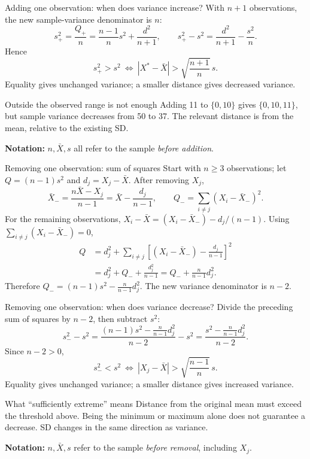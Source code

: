 \documentclass[aspectratio=169,11pt]{beamer}
\begin{document}
\begin{frame}{Adding one observation: when does variance increase?}
  \small
  With \(n+1\) observations, the new sample-variance denominator is \(n\):
  \[
    s_+^2=\frac{Q_+}{n}=\frac{n-1}{n}s^2+\frac{d^2}{n+1},
    \qquad
    s_+^2-s^2=\frac{d^2}{n+1}-\frac{s^2}{n}.
  \]
  Hence
  \[
    {s_+^2>s^2\ \Longleftrightarrow\
    |X^*-\bar X|>\sqrt{\frac{n+1}{n}}\,s.}
  \]
  Equality gives unchanged variance; a smaller distance gives decreased variance.
  \begin{alertblock}{Outside the observed range is not enough}
    Adding 11 to \(\{0,10\}\) gives \(\{0,10,11\}\),
    but sample variance decreases from 50 to 37.
    The relevant distance is from the mean, relative to the existing SD.
  \end{alertblock}
  \textbf{Notation:} \(n,\bar X,s\) all refer to the sample \emph{before addition}.
\end{frame}

\begin{frame}{Removing one observation: sum of squares}
  \small
  Start with \(n\geq3\) observations; let \(Q=(n-1)s^2\) and
  \(d_j=X_j-\bar X\). After removing \(X_j\),
  \[
    \bar X_- =\frac{n\bar X-X_j}{n-1}=\bar X-\frac{d_j}{n-1},
    \qquad Q_-=\sum_{i\ne j}(X_i-\bar X_-)^2.
  \]
  For the remaining observations,
  \(X_i-\bar X=(X_i-\bar X_-)-d_j/(n-1)\).
  Using \(\sum_{i\ne j}(X_i-\bar X_-)=0\),
  \[
  \begin{aligned}
    Q&=d_j^2+\sum_{i\ne j}
            \left[(X_i-\bar X_-)-\frac{d_j}{n-1}\right]^2\\
     &=d_j^2+Q_-+\frac{d_j^2}{n-1}
      =Q_-+\frac{n}{n-1}d_j^2.
  \end{aligned}
  \]
  Therefore \({Q_-=(n-1)s^2-\frac{n}{n-1}d_j^2}\).
  \quad The new variance denominator is \(n-2\).
\end{frame}

\begin{frame}{Removing one observation: when does variance decrease?}
  \small
  Divide the preceding sum of squares by \(n-2\), then subtract \(s^2\):
  \[
    s_-^2-s^2
    =\frac{(n-1)s^2-\frac{n}{n-1}d_j^2}{n-2}-s^2
    =\frac{s^2-\frac{n}{n-1}d_j^2}{n-2}.
  \]
  Since \(n-2>0\),
  \[
    {s_-^2<s^2\ \Longleftrightarrow\
    |X_j-\bar X|>\sqrt{\frac{n-1}{n}}\,s.}
  \]
  Equality gives unchanged variance; a smaller distance gives increased variance.
  \begin{block}{What ``sufficiently extreme'' means}
    Distance from the original mean must exceed the threshold above.
    Being the minimum or maximum alone does not guarantee a decrease.
    SD changes in the same direction as variance.
  \end{block}
  \textbf{Notation:} \(n,\bar X,s\) refer to the sample \emph{before removal},
  including \(X_j\).
\end{frame}
\end{document}
